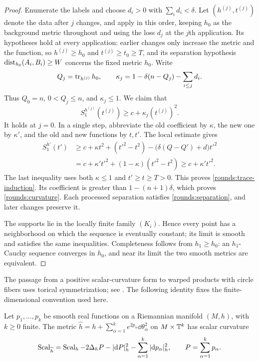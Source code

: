 \begin{proof}
Enumerate the labels and choose \(d_i>0\) with
\(\sum_i d_i<\delta\). Let \((h^{(j)},t^{(j)})\) denote the data after
\(j\) changes, and apply  in this order, keeping \(h_0\)
as the background metric throughout and using the loss \(d_j\) at the
\(j\)th application. Its hypotheses hold at every application: earlier
changes only increase the metric and the function, so
\(h^{(j)}\ge h_0\) and \(t^{(j)}\ge t_0\ge T\), and its separation
hypothesis \(\operatorname{dist}_{h_0}(A_i,B_i)\ge W\) concerns the fixed metric
\(h_0\). Write
\[
 Q_j=\operatorname{tr}_{h^{(j)}}h_0,\qquad
 \kappa_j=1-\delta(n-Q_j)-\sum_{i\le j}d_i.
\]
Thus \(Q_0=n\), \(0<Q_j\le n\), and \(\kappa_j\le1\).
We claim that
\begin{equation}\label{rounds:trace-induction}
 S^{h^{(j)}}_1(t^{(j)})\ge c+\kappa_j(t^{(j)})^2.
\end{equation}
It holds at \(j=0\). In a single step, abbreviate the old coefficient
by \(\kappa\), the new one by \(\kappa'\), and the old and new functions
by \(t,t'\). The local estimate gives
\begin{align*}
 S^{h'}_1(t')
 &\ge c+\kappa t^2+(t'^2-t^2)
       -\bigl(\delta(Q-Q')+d\bigr)t'^2\\
 &=c+\kappa't'^2+(1-\kappa)(t'^2-t^2)\ge c+\kappa't'^2.
\end{align*}
The last inequality uses both \(\kappa\le1\) and \(t'\ge t\ge T>0\).
This proves \eqref{rounds:trace-induction}. Its coefficient is greater
than \(1-(n+1)\delta\), which proves \eqref{rounds:curvature}.
Each processed separation satisfies \eqref{rounds:separation}, and
later changes preserve it.

The supports lie in the locally finite family \((K_i)\). Hence every
point has a neighborhood on which the sequence is eventually constant;
its limit is smooth and satisfies the same inequalities. Completeness
follows from \(h_1\ge h_0\): an \(h_1\)-Cauchy sequence converges in
\(h_0\), and near its limit the two smooth metrics are equivalent.
\end{proof}

The passage from a positive scalar-curvature form to warped products with circle fibers uses
torical symmetrization; see \citet[Section~2]{gromov2018Metric}. The
following identity fixes the finite-dimensional convention used here.

\begin{lemma}\label{rounds:torus-curvature}
Let \(p_1,\ldots,p_k\) be smooth real functions on a Riemannian
manifold \((M,h)\), with \(k\ge0\) finite. The metric
\(\widehat h=h+\sum_{\alpha=1}^k e^{2p_\alpha}\dd\theta_\alpha^2\)
on \(M\times\mathbb T^k\) has scalar curvature
\[
 \operatorname{Scal}_{\widehat h}=\operatorname{Scal}_h-2\Delta_h P-|\mathrm d P|_h^2
                    -\sum_{\alpha=1}^k|\mathrm d p_\alpha|_h^2,
 \qquad P=\sum_{\alpha=1}^k p_\alpha.
\]
\end{lemma}

